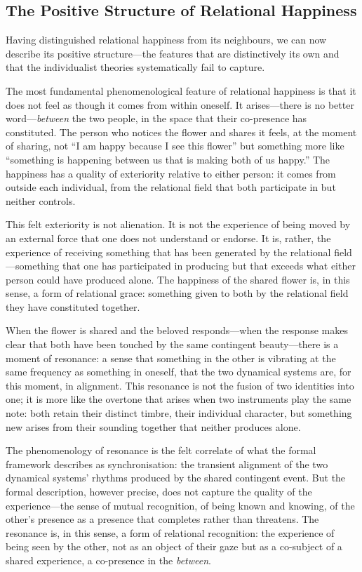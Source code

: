 \subsection{The Positive Structure of Relational Happiness}
\label{p14:subsec:posstruct}

\noindent
Having distinguished relational happiness from its neighbours, we can now describe its positive structure---the features that are distinctively its own and that the individualist theories systematically fail to capture.

 The most fundamental phenomenological feature of relational happiness is that it does not feel as though it comes from within oneself. It arises---there is no better word---\emph{between} the two people, in the space that their co-presence has constituted. The person who notices the flower and shares it feels, at the moment of sharing, not ``I am happy because I see this flower'' but something more like ``something is happening between us that is making both of us happy.'' The happiness has a quality of exteriority relative to either person: it comes from outside each individual, from the relational field that both participate in but neither controls.

This felt exteriority is not alienation. It is not the experience of being moved by an external force that one does not understand or endorse. It is, rather, the experience of receiving something that has been generated by the relational field---something that one has participated in producing but that exceeds what either person could have produced alone. The happiness of the shared flower is, in this sense, a form of relational grace: something given to both by the relational field they have constituted together.

 When the flower is shared and the beloved responds---when the response makes clear that both have been touched by the same contingent beauty---there is a moment of resonance: a sense that something in the other is vibrating at the same frequency as something in oneself, that the two dynamical systems are, for this moment, in alignment. This resonance is not the fusion of two identities into one; it is more like the overtone that arises when two instruments play the same note: both retain their distinct timbre, their individual character, but something new arises from their sounding together that neither produces alone.

The phenomenology of resonance is the felt correlate of what the formal framework describes as synchronisation: the transient alignment of the two dynamical systems' rhythms produced by the shared contingent event. But the formal description, however precise, does not capture the quality of the experience---the sense of mutual recognition, of being known and knowing, of the other's presence as a presence that completes rather than threatens. The resonance is, in this sense, a form of relational recognition: the experience of being seen by the other, not as an object of their gaze but as a co-subject of a shared experience, a co-presence in the \emph{between}.

